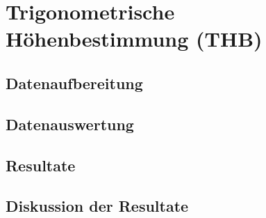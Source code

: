 \section{Trigonometrische Höhenbestimmung (THB)}
\label{sec:thb}

\subsection{Datenaufbereitung}
\label{sec:datenaufbereitung}

\subsection{Datenauswertung}
\label{sec:datenauswertung}

\subsection{Resultate}
\label{sec:resultate}

\subsection{Diskussion der Resultate}
\label{sec:diskussion der resultate}